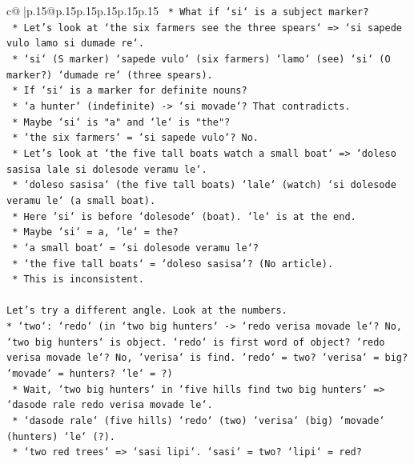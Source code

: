 \documentclass{article}
\begin{document}
{\begin{supertabular}{c@{$\;$}|p{.15\linewidth}@{}p{.15\linewidth}p{.15\linewidth}p{.15\linewidth}p{.15\linewidth}p{.15\linewidth}}
{{{\texttt{                *   What if `si` is a subject marker?} \\
\texttt{                *   Let's look at `the six farmers see the three spears` => `si sapede vulo lamo si dumade re`.} \\
\texttt{                *   `si` (S marker) `sapede vulo` (six farmers) `lamo` (see) `si` (O marker?) `dumade re` (three spears).} \\
\texttt{                *   If `si` is a marker for definite nouns?} \\
\texttt{                *   `a hunter` (indefinite) {-}> `si movade`? That contradicts.} \\
\texttt{                *   Maybe `si` is "a" and `le` is "the"?} \\
\texttt{                *   `the six farmers` = `si sapede vulo`? No.} \\
\texttt{                *   Let's look at `the five tall boats watch a small boat` => `doleso sasisa lale si dolesode veramu le`.} \\
\texttt{                *   `doleso sasisa` (the five tall boats) `lale` (watch) `si dolesode veramu le` (a small boat).} \\
\texttt{                *   Here `si` is before `dolesode` (boat). `le` is at the end.} \\
\texttt{                *   Maybe `si` = a, `le` = the?} \\
\texttt{                *   `a small boat` = `si dolesode veramu le`?} \\
\texttt{                *   `the five tall boats` = `doleso sasisa`? (No article).} \\
\texttt{                *   This is inconsistent.} \\
\\ 
\texttt{Let's try a different angle. Look at the numbers.} \\
\texttt{*   `two`: `redo` (in `two big hunters` {-}> `redo verisa movade le`? No, `two big hunters` is object. `redo` is first word of object? `redo verisa movade le`? No, `verisa` is find. `redo` = two? `verisa` = big? `movade` = hunters? `le` = ?)} \\
\texttt{    *   Wait, `two big hunters` in `five hills find two big hunters` => `dasode rale redo verisa movade le`.} \\
\texttt{    *   `dasode rale` (five hills) `redo` (two) `verisa` (big) `movade` (hunters) `le` (?).} \\
\texttt{    *   `two red trees` => `sasi lipi`. `sasi` = two? `lipi` = red?} \\
}}}
\end{supertabular}}
\end{document}
